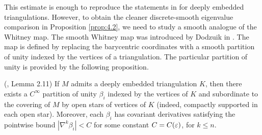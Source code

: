 This estimate is enough to reproduce the statements in \cite{LS} for deeply embedded triangulations. However, to obtain the cleaner discrete-smooth eigenvalue comparison in Proposition \ref{prop:4.2}, we need to study a smooth analogue of the Whitney map. The smooth Whitney map was introduced by Dodzuik in \cite{dodzuik2}. The map is defined by replacing the barycentric coordinates with a smooth partition of unity indexed by the vertices of a triangulation. The particular partition of unity is provided by the following proposition.

\begin{prop} \label{prop: partition existence} (\cite{dodzuik2}, Lemma 2.11)
If $M$ admits a deeply embedded triangulation $K$, then there exists a $C^{\infty}$ partition of unity $\beta_i$ indexed by the vertices of $K$ and subordinate to the covering of $M$ by open stars of vertices of $K$ (indeed, compactly supported in each open star). Moreover, each $\beta_i$ has covariant derivatives satisfying the pointwise bound $|\nabla^k\beta_i|< C$ for some constant $C = C(\varepsilon)$, for $k\leq n$.
\end{prop}

